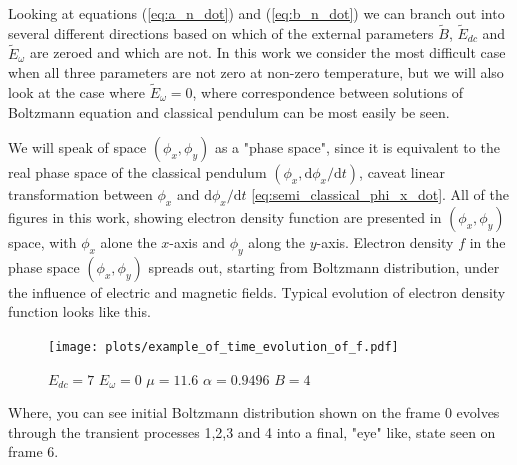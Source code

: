 \documentclass[40pt,letterpaper,physrev]{article}
\begin{document}
    Looking at equations (\ref{eq:a_n_dot}) and (\ref{eq:b_n_dot}) we can branch out into several different 
    directions based on which of the external parameters $\tilde{B}$, $\tilde{E}_{dc}$ and $\tilde{E}_\omega$ 
    are zeroed and which are not. In this work we consider the most difficult case when all three parameters
    are not zero at non-zero temperature, but we will also look at the case where $\tilde{E}_\omega=0$, where
    correspondence between solutions of Boltzmann equation and classical pendulum can be most easily be seen.
    
    We will speak of space $(\phi_x,\phi_y)$ as a "phase space", since it is equivalent to the real phase space of 
    the classical pendulum $(\phi_x,\text{d}\phi_x/\text{d}t)$, caveat linear transformation between $\phi_x$ and 
    $\text{d}\phi_x/\text{d}t$ \ref{eq:semi_classical_phi_x_dot}. All of the figures in this work, showing electron 
    density function are presented in $(\phi_x,\phi_y)$ space, with $\phi_x$ alone the $x$-axis and $\phi_y$ along
    the $y$-axis. Electron density $f$ in the phase space $(\phi_x,\phi_y)$ spreads out, starting from Boltzmann 
    distribution, under the influence of electric and magnetic fields. Typical evolution of electron density function
    looks like this.
    \begin{figure}[H]
   	  \centering
	  \normalsize %
	  \texttt{[image: plots/example\_of\_time\_evolution\_of\_f.pdf]}
	  \label{fig:example_of_time_evolution_of_f}
	  \caption{$E_{dc}=7$ $E_\omega=0$ $\mu=11.6$ $\alpha=0.9496$ $B=4$}
	\end{figure}
	Where, you can see initial Boltzmann distribution shown on the frame 0 evolves through the transient 
	processes 1,2,3 and 4 into a final, "eye" like, state seen on frame 6.
	
\end{document}
